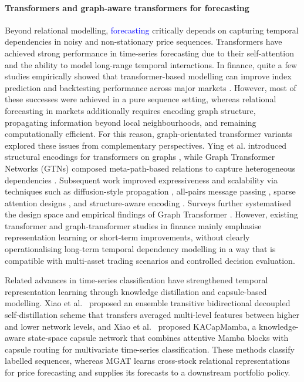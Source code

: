 \documentclass[pdflatex,sn-mathphys-num]{sn-jnl}%
\theoremstyle{thmstyleone}%
\theoremstyle{thmstyletwo}%
\theoremstyle{thmstylethree}%
\begin{document}
\paragraph{Transformers and graph-aware transformers for forecasting}
Beyond relational modelling, \textcolor{blue}{forecasting} critically depends on capturing temporal dependencies in noisy and non-stationary price sequences. 
Transformers have achieved strong performance in time-series forecasting due to their self-attention and the ability to model long-range temporal interactions. 
In finance, quite a few studies empirically showed that transformer-based modelling can improve index prediction and backtesting performance across major markets \citep{Wang2022ESWA_TransformerIndex}. 
However, most of these successes were achieved in a pure sequence setting, whereas relational forecasting in markets additionally requires encoding graph structure, propagating information beyond local neighbourhoods, and remaining computationally efficient.
For this reason, graph-orientated transformer variants explored these issues from complementary perspectives. 
Ying et al. introduced structural encodings for transformers on graphs \citep{Ying2021NeurIPSTransformersGraph}, while Graph Transformer Networks (GTNs) composed meta-path-based relations to capture heterogeneous dependencies \citep{Yun2019GraphTransformerNetworks}. 
Subsequent work improved expressiveness and scalability via techniques such as diffusion-style propagation \citep{Gao2024DiffsFormer}, all-pairs message passing \citep{Wu2023NodeFormer}, sparse attention designs \citep{Shirzad2023Exphormer}, and structure-aware encoding \citep{Chen2022StructureAwareTransformerGraphs}. 
Surveys further systematised the design space and empirical findings of Graph Transformer \citep{Shehzad2024GraphTransformersSurvey}.
However, existing transformer and graph-transformer studies in finance mainly emphasise representation learning or short-term improvements, without clearly operationalising long-term temporal dependency modelling in a way that is compatible with multi-asset trading scenarios and controlled decision evaluation.
{\color{blue}Related advances in time-series classification have strengthened temporal representation learning through knowledge distillation and capsule-based modelling. Xiao et al.~\citep{Xiao2026ETBDSD} proposed an ensemble transitive bidirectional decoupled self-distillation scheme that transfers averaged multi-level features between higher and lower network levels, and Xiao et al.~\citep{KASSCN2026} proposed KACapMamba, a knowledge-aware state-space capsule network that combines attentive Mamba blocks with capsule routing for multivariate time-series classification. These methods classify labelled sequences, whereas MGAT learns cross-stock relational representations for price forecasting and supplies its forecasts to a downstream portfolio policy.\par}
\end{document}
